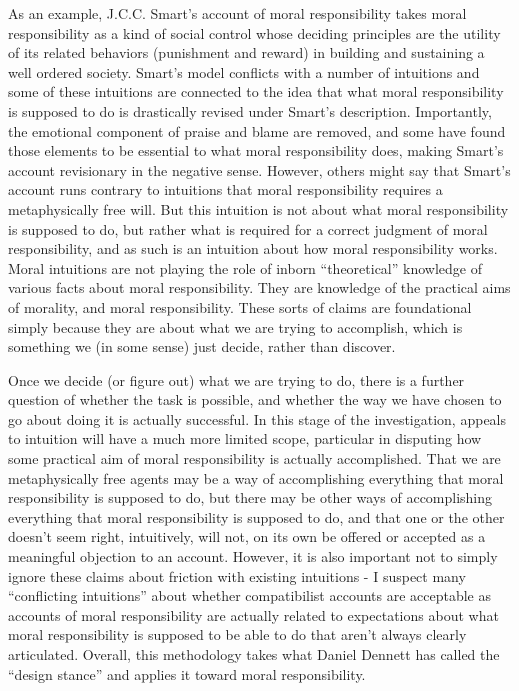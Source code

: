 \documentclass[phd,12pt,oneside,paper=letterpaper]{ubcthesis}
\begin{document}
As an example, J.C.C. Smart's \citep{smart1961} account of moral responsibility takes moral responsibility as a kind of social control whose deciding principles are the utility of its related behaviors (punishment and reward) in building and sustaining a well ordered society. Smart's model conflicts with a number of intuitions and some of these intuitions are connected to the idea that what moral responsibility is supposed to do is drastically revised under Smart's description. Importantly, the emotional component of praise and blame are removed, and some have found those elements to be essential to what moral responsibility does, making Smart's account revisionary in the negative sense. However, others might say that Smart's account runs contrary to intuitions that moral responsibility requires a metaphysically free will. But this intuition is not about what moral responsibility is supposed to do, but rather what is required for a correct judgment of moral responsibility, and as such is an intuition about how moral responsibility works. Moral intuitions are not playing the role of inborn ``theoretical'' knowledge of various facts about moral responsibility. They are knowledge of the practical aims of morality, and moral responsibility. These sorts of claims are foundational simply because they are about what we are trying to accomplish, which is something we (in some sense) just decide, rather than discover.

Once we decide (or figure out) what we are trying to do, there is a further question of whether the task is possible, and whether the way we have chosen to go about doing it is actually successful. In this stage of the investigation, appeals to intuition will have a much more limited scope, particular in disputing how some practical aim of moral responsibility is actually accomplished. That we are metaphysically free agents may be a way of accomplishing everything that moral responsibility is supposed to do, but there may be other ways of accomplishing everything that moral responsibility is supposed to do, and that one or the other doesn't seem right, intuitively, will not, on its own be offered or accepted as a meaningful objection to an account. However, it is also important not to simply ignore these claims about friction with existing intuitions - I suspect many ``conflicting intuitions'' about whether compatibilist accounts are acceptable as accounts of moral responsibility are actually related to expectations about what moral responsibility is supposed to be able to do that aren't always clearly articulated. Overall, this methodology takes what Daniel Dennett \citeyearpar{dennett1987} has called the ``design stance'' and applies it toward moral responsibility.
\end{document}
